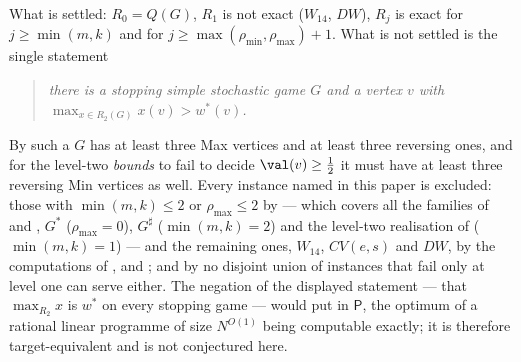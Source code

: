 \begin{remark}\label{cl:gap}
What is settled: $R_0=Q(G)$, $R_1$ is not exact ($W_{14}$, $DW$), $R_j$ is
exact for $j\ge\min(m,k)$ and for $j\ge\max(\rho_{\min},\rho_{\max})+1$. What is
not settled is the single statement
\begin{quote}
\emph{there is a stopping simple stochastic game $G$ and a vertex $v$ with
$\max_{x\in R_2(G)}x(v)>w^{\ast}(v)$.}
\end{quote}
By  such a $G$ has at least three Max vertices and at least
three reversing ones, and for the level-two \emph{bounds} to fail to decide
$\val(v)\ge\frac12$ it must have at least three reversing Min vertices as well.
Every instance named in this paper is excluded: those with
$\min(m,k)\le2$ or $\rho_{\max}\le2$ by  --- which covers all
the families of  and , $G^{\ast}$ ($\rho_{\max}=0$),
$G^{\sharp}$ ($\min(m,k)=2$) and the level-two realisation of
 ($\min(m,k)=1$) --- and the remaining ones,
$W_{14}$, $CV(e,s)$ and $DW$, by the computations of ,
 and ; and by  no disjoint union of
instances that fail only at level one can serve either. The negation of the
displayed statement --- that $\max_{R_2}x$ is $w^{\ast}$ on every stopping game
--- would put  in $\mathsf P$, the optimum of a rational linear
programme of size $N^{O(1)}$ being computable exactly; it is therefore
target-equivalent and is not conjectured here.
\end{remark}
